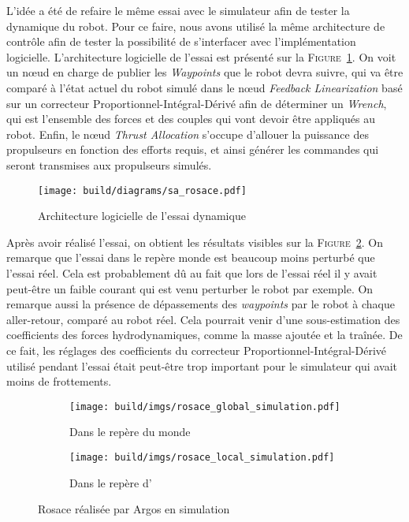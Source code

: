 			L'idée a été de refaire le même essai avec le simulateur afin de tester la dynamique du robot. Pour ce faire, nous avons utilisé la même architecture de contrôle afin de tester la possibilité de s'interfacer avec l'implémentation logicielle. L'architecture logicielle de l'essai est présenté sur la \textsc{Figure}~\ref{fig:sa_rosace}. On voit un n\oe ud en charge de publier les \textit{Waypoints} que le robot devra suivre, qui va être comparé à l'état actuel du robot simulé dans le n\oe ud \textit{Feedback Linearization} basé sur un correcteur Proportionnel-Intégral-Dérivé afin de déterminer un \textit{Wrench}, qui est l'ensemble des forces et des couples qui vont devoir être appliqués au robot. Enfin, le n\oe ud \textit{Thrust Allocation} s'occupe d'allouer la puissance des propulseurs en fonction des efforts requis, et ainsi générer les commandes qui seront transmises aux propulseurs simulés.

			\begin{figure}[!htb]
				\centering
				\texttt{[image: build/diagrams/sa\_rosace.pdf]}
				\caption{Architecture logicielle de l'essai dynamique}
				\label{fig:sa_rosace}
			\end{figure}

			Après avoir réalisé l'essai, on obtient les résultats visibles sur la \textsc{Figure}~\ref{fig:rosace_argos_simulation}. On remarque que l'essai dans le repère monde est beaucoup moins perturbé que l'essai réel. Cela est probablement dû au fait que lors de l'essai réel il y avait peut-être un faible courant qui est venu perturber le robot par exemple. On remarque aussi la présence de dépassements des \textit{waypoints} par le robot à chaque aller-retour, comparé au robot réel. Cela pourrait venir d'une sous-estimation des coefficients des forces hydrodynamiques, comme la masse ajoutée et la traînée. De ce fait, les réglages des coefficients du correcteur Proportionnel-Intégral-Dérivé utilisé pendant l'essai était peut-être trop important pour le simulateur qui avait moins de frottements.

			\begin{figure}[!htb]
				\centering
				\begin{subfigure}[t]{0.48\textwidth}
					\centering
					\texttt{[image: build/imgs/rosace\_global\_simulation.pdf]}
					\caption{Dans le repère du monde}
				\end{subfigure}
				\hfill
				\begin{subfigure}[t]{0.48\textwidth}
					\centering
					\texttt{[image: build/imgs/rosace\_local\_simulation.pdf]}
					\caption{Dans le repère d'\argos{}}
				\end{subfigure}
				\caption{Rosace réalisée par Argos en simulation}
				\label{fig:rosace_argos_simulation}
			\end{figure}

